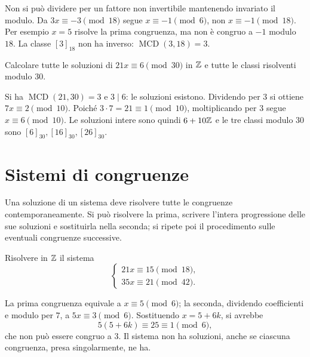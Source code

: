 \begin{osservazione}
Non si può dividere per un fattore non invertibile mantenendo invariato il modulo. Da $3x\equiv-3\pmod{18}$ segue $x\equiv-1\pmod6$, non $x\equiv-1\pmod{18}$. Per esempio $x=5$ risolve la prima congruenza, ma non è congruo a $-1$ modulo $18$. La classe $[3]_{18}$ non ha inverso: $\operatorname{MCD}(3,18)=3$.
\end{osservazione}

\begin{esercizio}
Calcolare tutte le soluzioni di $21x\equiv6\pmod{30}$ in $\mathbb{Z}$ e tutte le classi risolventi modulo $30$.
\end{esercizio}
\begin{svolgimento}
Si ha $\operatorname{MCD}(21,30)=3$ e $3\mid6$: le soluzioni esistono. Dividendo per $3$ si ottiene $7x\equiv2\pmod{10}$. Poiché $3\cdot7=21\equiv1\pmod{10}$, moltiplicando per $3$ segue $x\equiv6\pmod{10}$. Le soluzioni intere sono quindi $6+10\mathbb{Z}$ e le tre classi modulo $30$ sono $[6]_{30},[16]_{30},[26]_{30}$.
\end{svolgimento}

\section{Sistemi di congruenze}
Una soluzione di un sistema deve risolvere tutte le congruenze contemporaneamente. Si può risolvere la prima, scrivere l'intera progressione delle sue soluzioni e sostituirla nella seconda; si ripete poi il procedimento sulle eventuali congruenze successive.

\begin{esercizio}
Risolvere in $\mathbb{Z}$ il sistema
\[
\begin{cases}
21x\equiv15\pmod{18},\\
35x\equiv21\pmod{42}.
\end{cases}
\]
\end{esercizio}
\begin{svolgimento}
La prima congruenza equivale a $x\equiv5\pmod6$; la seconda, dividendo coefficienti e modulo per $7$, a $5x\equiv3\pmod6$. Sostituendo $x=5+6k$, si avrebbe
\[
5(5+6k)\equiv25\equiv1\pmod6,
\]
che non può essere congruo a $3$. Il sistema non ha soluzioni, anche se ciascuna congruenza, presa singolarmente, ne ha.
\end{svolgimento}


